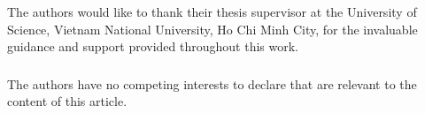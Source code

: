\documentclass[runningheads]{llncs}
\begin{document}
\begin{credits}
\subsubsection{\ackname}
The authors would like to thank their thesis supervisor at the University of
Science, Vietnam National University, Ho Chi Minh City, for the invaluable
guidance and support provided throughout this work.

\subsubsection{\discintname}
The authors have no competing interests to declare that are relevant to the
content of this article.
\end{credits}
%
%
%
% 
% 
%
\end{document}

